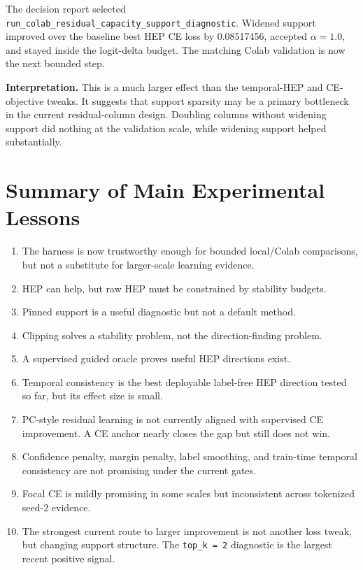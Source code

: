 \documentclass[11pt]{article}
\begin{document}
The decision report selected \texttt{run\_colab\_residual\_capacity\_support\_diagnostic}.
Widened support improved over the baseline best HEP CE loss by 0.08517456,
accepted $\alpha=1.0$, and stayed inside the logit-delta budget. The matching
Colab validation is now the next bounded step.

\textbf{Interpretation.} This is a much larger effect than the temporal-HEP
and CE-objective tweaks. It suggests that support sparsity may be a primary
bottleneck in the current residual-column design. Doubling columns without
widening support did nothing at the validation scale, while widening support
helped substantially.

\section{Summary of Main Experimental Lessons}

\begin{enumerate}
  \item The harness is now trustworthy enough for bounded local/Colab
  comparisons, but not a substitute for larger-scale learning evidence.
  \item HEP can help, but raw HEP must be constrained by stability budgets.
  \item Pinned support is a useful diagnostic but not a default method.
  \item Clipping solves a stability problem, not the direction-finding problem.
  \item A supervised guided oracle proves useful HEP directions exist.
  \item Temporal consistency is the best deployable label-free HEP direction
  tested so far, but its effect size is small.
  \item PC-style residual learning is not currently aligned with supervised CE
  improvement. A CE anchor nearly closes the gap but still does not win.
  \item Confidence penalty, margin penalty, label smoothing, and train-time
  temporal consistency are not promising under the current gates.
  \item Focal CE is mildly promising in some scales but inconsistent across
  tokenized seed-2 evidence.
  \item The strongest current route to larger improvement is not another loss
  tweak, but changing support structure. The \texttt{top\_k = 2} diagnostic is
  the largest recent positive signal.
\end{enumerate}
\end{document}
